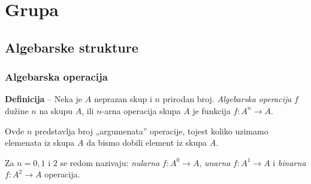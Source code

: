 \documentclass[a4paper,12pt]{article}
\begin{document}
\section{Grupa}

\subsection{Algebarske strukture}

\subsubsection{Algebarska operacija}

\textbf{Definicija} -- Neka je \(A\) neprazan skup i \(n\) prirodan broj.
\emph{Algebarska operacija} \(f\) dužine \(n\) na skupu \(A\), ili \(n\)-arna
operacija skupa \(A\) je funkcija \( f : A^n \rightarrow A \).

Ovde \( n \) predstavlja broj „argumenata” operacije, tojest koliko uzimamo elemenata iz skupa \( A \) da bismo dobili element iz skupa \( A \).

Za \(n = 0, 1\) i \(2\) se redom nazivaju: \emph{nularna} \(f:A^0 \rightarrow A\), \emph{unarna} \(f:A^1 \rightarrow A\) i \emph{binarna} \(f:A^2 \rightarrow A\) operacija.
\end{document}
